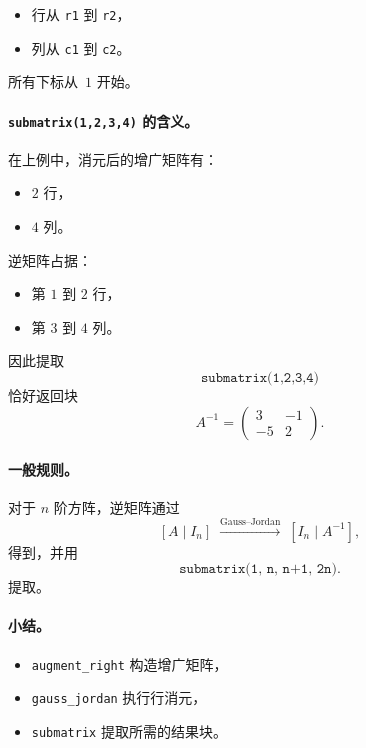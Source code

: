 \begin{itemize}
  \item 行从 \texttt{r1} 到 \texttt{r2}，
  \item 列从 \texttt{c1} 到 \texttt{c2}。
\end{itemize}

所有下标从~$1$ 开始。

\medskip

\paragraph{\texttt{submatrix(1,2,3,4)} 的含义。}
在上例中，消元后的增广矩阵有：
\begin{itemize}
  \item $2$ 行，
  \item $4$ 列。
\end{itemize}

逆矩阵占据：
\begin{itemize}
  \item 第 $1$ 到 $2$ 行，
  \item 第 $3$ 到 $4$ 列。
\end{itemize}

因此提取
\[
\texttt{submatrix(1,2,3,4)}
\]
恰好返回块
\[
A^{-1} =
\begin{pmatrix}
3 & -1\\
-5 & 2
\end{pmatrix}.
\]

\medskip

\paragraph{一般规则。}
对于 $n$ 阶方阵，逆矩阵通过
\[
[A \mid I_n]
\;\xrightarrow{\text{Gauss--Jordan}}\;
[I_n \mid A^{-1}],
\]
得到，并用
\[
\texttt{submatrix(1, n, n+1, 2n)}.
\]
提取。

\medskip

\paragraph{小结。}
\begin{itemize}
  \item \texttt{augment\_right} 构造增广矩阵，
  \item \texttt{gauss\_jordan} 执行行消元，
  \item \texttt{submatrix} 提取所需的结果块。
\end{itemize}

\endinput
